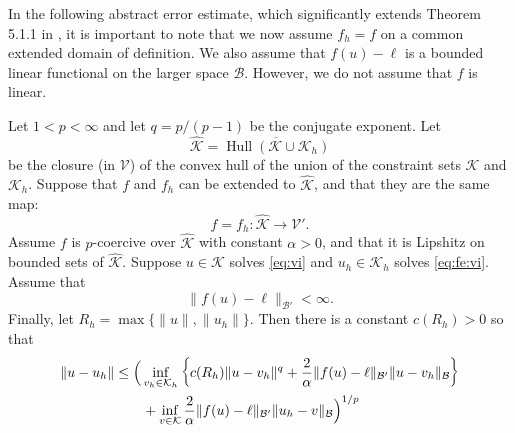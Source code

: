 \documentclass[hidelinks,onefignum,onetabnum,final]{siamart220329}  %
\newcommand{\cB}{\mathcal{B}}
\newcommand{\cK}{\mathcal{K}}
\newcommand{\cV}{\mathcal{V}}
\newcommand{\hcK}{\widehat{\cK}}
\DeclareMathOperator*{\Hull}{Hull}
\begin{document}
In the following abstract error estimate, which significantly extends Theorem 5.1.1 in \cite{Ciarlet2002}, it is important to note that we now assume $f_h=f$ on a common extended domain of definition.  We also assume that $f(u)-\ell$ is a bounded linear functional on the larger space $\cB$.  However, we do not assume that $f$ is linear.

\begin{theorem} \label{thm:abstractestimate}
Let $1<p<\infty$ and let $q=p/(p-1)$ be the conjugate exponent.  Let
    $$\hcK = \overline{\Hull{(\cK \cup \cK_h)}}$$
be the closure (in $\cV$) of the convex hull of the union of the constraint sets $\cK$ and $\cK_h$.  Suppose that $f$ and $f_h$ can be extended to $\hcK$, and that they are the same map:
\begin{equation}
f=f_h:\hcK \to \cV'.  \label{eq:commonextension}
\end{equation}
Assume $f$ is $p$-coercive over $\hcK$ with constant $\alpha>0$, and that it is Lipshitz on bounded sets of $\hcK$.  Suppose $u\in\cK$ solves \eqref{eq:vi} and $u_h\in\cK_h$ solves \eqref{eq:fe:vi}.  Assume that
\begin{equation}
\|f(u)-\ell\|_{\cB'} < \infty.  \label{eq:fellboundedB}
\end{equation}
Finally, let $R_h=\max\{\|u\|,\|u_h\|\}$.  Then there is a constant $c(R_h)>0$ so that
\begin{align}
\|u-u_h\| &\le \Big(\inf_{v_h\in\cK_h} \left\{c(R_h) \|u - v_h\|^q + \frac{2}{\alpha} \|f(u)-\ell\|_{\cB'} \|u-v_h\|_{\cB}\right\} \label{eq:abstractestimate} \\
   &\qquad + \inf_{v\in\cK} \frac{2}{\alpha} \|f(u)-\ell\|_{\cB'} \|u_h-v\|_{\cB}\Big)^{1/p} \notag
\end{align}
\end{theorem}
\end{document}
